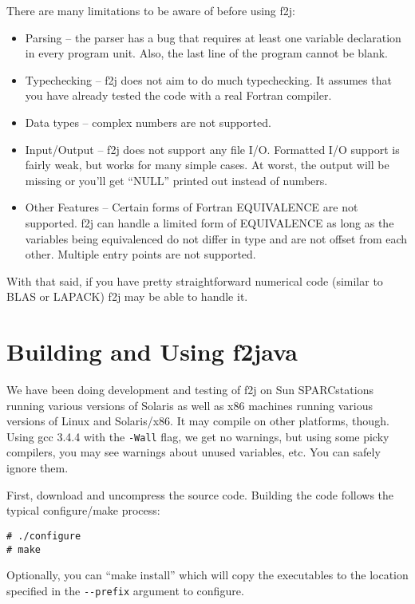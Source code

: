 \documentclass[11pt]{article}
\begin{document}
There are many limitations to be aware of before using f2j:
\begin{itemize}
\item Parsing -- the parser has a bug that requires at least one variable
declaration in every program unit.  Also, the last line of the program
cannot be blank.
\item Typechecking -- f2j does not aim to do much typechecking.  It assumes
that you have already tested the code with a real Fortran compiler.
\item Data types -- complex numbers are not supported.
\item Input/Output -- f2j does not support any file I/O.  Formatted
I/O support is fairly weak, but works for many simple cases.  At worst, the
output will be missing or you'll get ``NULL'' printed out instead of numbers.
\item Other Features -- Certain forms of Fortran EQUIVALENCE are not
supported.  f2j can handle a limited form of EQUIVALENCE as long as the variables
being equivalenced do not differ in type and are not offset from each other.
Multiple entry points are not supported.
\end{itemize}

With that said, if you have pretty straightforward numerical code (similar to
BLAS or LAPACK) f2j may be able to handle it.

\section{Building and Using f2java}

We have been doing development and testing of f2j on Sun SPARCstations running
various versions of Solaris as well as x86 machines running various versions
of Linux and Solaris/x86.  It may compile on
other platforms, though.  Using gcc 3.4.4 with the \verb|-Wall| flag, we get no
warnings, but using some picky compilers, you may see warnings about 
unused variables, etc.  You can safely ignore them.

First, download and uncompress the source code.  Building the code follows the typical configure/make process:

\begin{verbatim}
# ./configure
# make
\end{verbatim}

Optionally, you can ``make install'' which will copy the executables to the
location specified in the \verb|--prefix| argument to configure.
\end{document}
